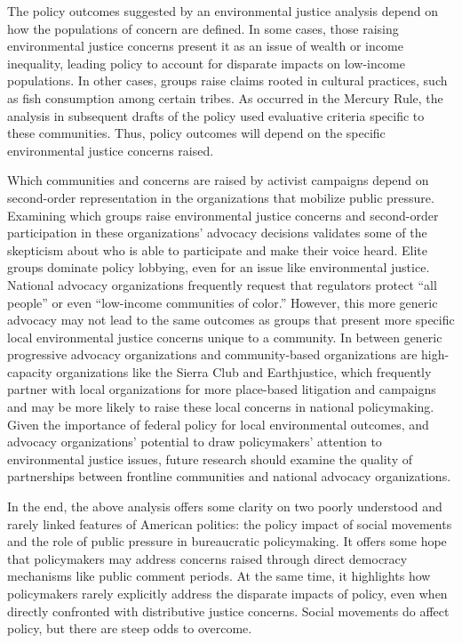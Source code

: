 \documentclass[
      12pt,
        ]{article}
\begin{document}
The policy outcomes suggested by an environmental justice analysis depend on how the populations of concern are defined. In some cases, those raising environmental justice concerns
present it as an issue of wealth or income inequality, leading policy to
account for disparate impacts on low-income populations. In other cases,
groups raise claims rooted in cultural practices, such as fish
consumption among certain tribes. As occurred in the Mercury Rule, the
analysis in subsequent drafts of the policy used evaluative criteria
specific to these communities. Thus, policy outcomes
will depend on the specific environmental justice concerns raised.

Which communities and concerns are raised by activist campaigns depend on second-order representation in the organizations that mobilize public pressure. Examining which groups raise environmental justice concerns and second-order participation in these organizations' advocacy decisions validates some of the skepticism about who is able to
participate and make their voice heard. Elite groups dominate policy lobbying, even for
an issue like environmental justice. National
advocacy organizations frequently request that regulators protect
``all people'' or even ``low-income communities of color.'' However, this
more generic advocacy may not lead to the same outcomes as groups that present more specific local environmental justice concerns unique to a community. In between generic progressive advocacy organizations
and community-based organizations are high-capacity organizations like the Sierra Club and Earthjustice, which frequently partner with local organizations for more place-based litigation and campaigns and may be more likely to raise these local concerns in
national policymaking. Given the importance of federal policy for local environmental outcomes, and advocacy organizations' potential to draw policymakers' attention to environmental justice issues, future research should examine the quality of partnerships between frontline communities and national advocacy organizations.

In the end, the above analysis offers some clarity on two poorly
understood and rarely linked features of American politics: the policy impact of social movements and the role of public pressure in bureaucratic policymaking. It offers
some hope that policymakers may address concerns raised through direct democracy
mechanisms like public comment periods. At the same time, it highlights how policymakers rarely explicitly address the disparate impacts of policy, even when directly confronted with distributive justice concerns. Social movements do affect policy, but there are steep odds to overcome.
\newpage
\singlespacing 
           
   
\end{document}
